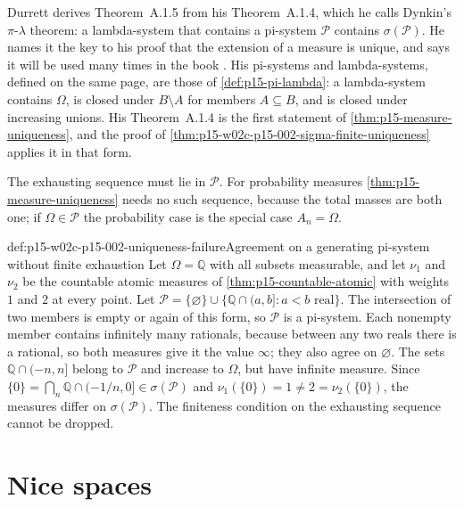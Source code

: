 Durrett derives Theorem~A.1.5 from his Theorem~A.1.4, which he calls
Dynkin's \(\pi\)-\(\lambda\) theorem: a lambda-system that contains a
pi-system \(\mathcal P\) contains \(\sigma(\mathcal P)\). He names it the key
to his proof that the extension of a measure is unique, and says it will be
used many times in the book \cite[Theorem~A.1.4, p.~456]{DurrettPTEAuthor2019}.
His pi-systems and lambda-systems, defined on the same page, are those of
\cref{def:p15-pi-lambda}: a lambda-system contains \(\Omega\), is closed
under \(B\setminus A\) for members \(A\subseteq B\), and is closed under
increasing unions. His Theorem~A.1.4 is the first statement of
\cref{thm:p15-measure-uniqueness}, and the proof of
\cref{thm:p15-w02c-p15-002-sigma-finite-uniqueness} applies it in that form.

The exhausting sequence must lie in \(\mathcal P\). For probability
measures \cref{thm:p15-measure-uniqueness} needs no such sequence, because
the total masses are both one; if \(\Omega\in\mathcal P\) the probability
case is the special case \(A_n=\Omega\).

\begin{hbexample}{def:p15-w02c-p15-002-uniqueness-failure}{Agreement on a generating pi-system without finite exhaustion}
Let \(\Omega=\mathbb Q\) with all subsets measurable, and let \(\nu_1\) and
\(\nu_2\) be the countable atomic measures of
\cref{thm:p15-countable-atomic} with weights \(1\) and \(2\) at every
point. Let
\(\mathcal P=\{\varnothing\}\cup\{\mathbb Q\cap(a,b]:a<b\text{ real}\}\).
The intersection of two members is empty or again of this form, so
\(\mathcal P\) is a pi-system. Each nonempty member contains infinitely
many rationals, because between any two reals there is a rational, so
both measures give it the value \(\infty\); they also agree on
\(\varnothing\). The sets \(\mathbb Q\cap(-n,n]\) belong to \(\mathcal P\)
and increase to \(\Omega\), but have infinite measure. Since
\(\{0\}=\bigcap_n\mathbb Q\cap(-1/n,0]\in\sigma(\mathcal P)\) and
\(\nu_1(\{0\})=1\neq2=\nu_2(\{0\})\), the measures differ on
\(\sigma(\mathcal P)\). The finiteness condition on the exhausting sequence
cannot be dropped.
\end{hbexample}

\section{Nice spaces}
\label{sec:p15-w02c-p15-002-nice}


